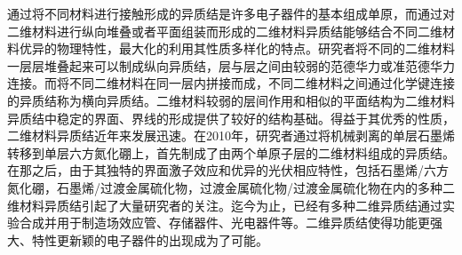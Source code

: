     通过将不同材料进行接触形成的异质结是许多电子器件的基本组成单原，而通过对二维材料进行纵向堆叠或者平面组装而形成的二维材料异质结能够结合不同二维材料优异的物理特性，最大化的利用其性质多样化的特点。研究者将不同的二维材料一层层堆叠起来可以制成纵向异质结，层与层之间由较弱的范德华力或准范德华力连接。而将不同二维材料在同一层内拼接而成，不同二维材料之间通过化学键连接的异质结称为横向异质结。二维材料较弱的层间作用和相似的平面结构为二维材料异质结中稳定的界面、界线的形成提供了较好的结构基础。得益于其优秀的性质，二维材料异质结近年来发展迅速。在2010年，研究者通过将机械剥离的单层石墨烯转移到单层六方氮化硼上，首先制成了由两个单原子层的二维材料组成的异质结。在那之后，由于其独特的界面激子效应和优异的光伏相应特性，包括石墨烯/六方氮化硼，石墨烯/过渡金属硫化物，过渡金属硫化物/过渡金属硫化物在内的多种二维材料异质结引起了大量研究者的关注。迄今为止，已经有多种二维异质结通过实验合成并用于制造场效应管、存储器件、光电器件等。二维异质结使得功能更强大、特性更新颖的电子器件的出现成为了可能。

